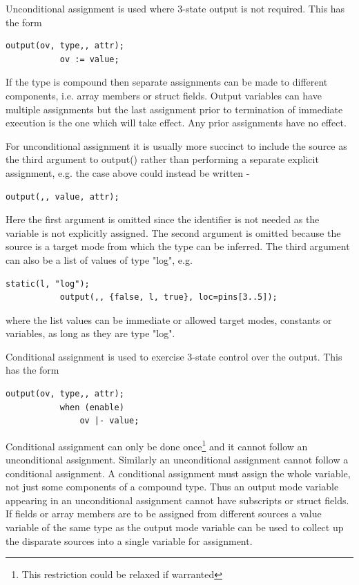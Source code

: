         Unconditional assignment is used where 3-state output is not required. This
        has the form
        \begin{lstlisting}[gobble=8, language=threepl]
           output(ov, type,, attr);
           ov := value;
        \end{lstlisting}
        If the type is compound then separate assignments can be made to
        different components, i.e. array members or struct fields. Output
        variables can have multiple assignments but the last assignment
        prior to termination of immediate execution is the one which
        will take effect. Any prior assignments have no effect.
        
        For unconditional assignment it is usually more succinct to include
        the source as the third argument to output() rather than performing a
        separate explicit assignment, e.g. the case above could instead be
        written -
        \begin{lstlisting}[gobble=8, language=threepl]
           output(,, value, attr);
        \end{lstlisting}
        Here the first argument is omitted since the identifier is not needed as
        the variable is not explicitly assigned. The second argument is omitted
        because the source is a target mode from which the type can be inferred.
        The third argument can also be a list of values of type "log", e.g.
        \begin{lstlisting}[gobble=8, language=threepl]
           static(l, "log");
           output(,, {false, l, true}, loc=pins[3..5]);
        \end{lstlisting}
        where the list values can be immediate or allowed target modes,
        constants or variables, as long as they are type "log".
        
        Conditional assignment is used to exercise 3-state control over
        the output. This has the form
        \begin{lstlisting}[gobble=8, language=threepl]
           output(ov, type,, attr);
           when (enable)
               ov |- value;
        \end{lstlisting}
        Conditional assignment can only be done once\footnote{This restriction
        could be relaxed if warranted} and it
        cannot follow an unconditional assignment. Similarly an
        unconditional assignment cannot follow a conditional assignment.
        A conditional assignment must assign the whole variable, not
        just some components of a compound type. Thus an output mode
        variable appearing in an unconditional assignment cannot have
        subscripts or struct fields. If fields or array members are to be
        assigned from different sources a value variable of the same type
        as the output mode variable can be used to collect up the disparate
        sources into a single variable for assignment.

